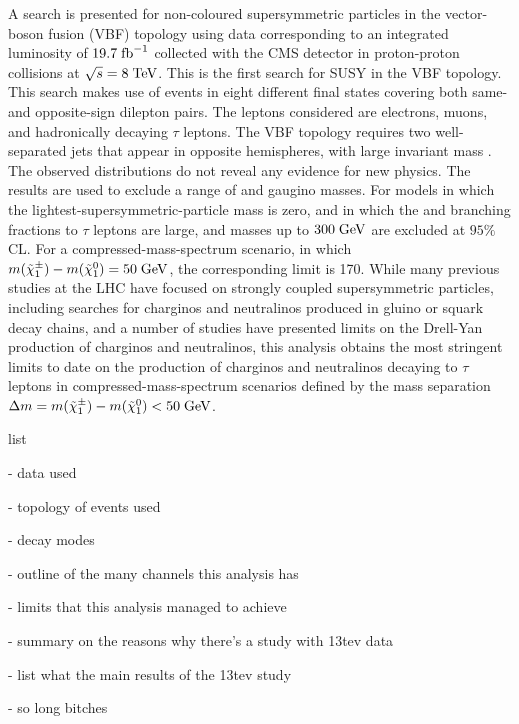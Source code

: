 


A search is presented for non-coloured supersymmetric particles in the vector-boson fusion (VBF) topology using data corresponding to an integrated luminosity of $19.7\;\text{fb}^{-1}$ collected with the CMS detector in proton-proton collisions at $\sqrt{s} = 8\;\text{Te}\kern-0.06667em\text{V}$. This is the first search for SUSY in the VBF topology. This search makes use of events in eight different final states covering both same- and opposite-sign dilepton pairs. The leptons considered are electrons, muons, and hadronically decaying $\tau$ leptons. The VBF topology requires two well-separated jets that appear in opposite hemispheres, with large invariant mass \mjj. The observed \mjj distributions do not reveal any evidence for new physics. The results are used to exclude a range of \charginopm and \neutralinotwo gaugino masses. For models in which the \neutralinoone lightest-supersymmetric-particle mass is zero, and in which the \charginopm and \neutralinotwo branching fractions to $\tau$ leptons are large, \charginopm and \neutralinotwo masses up to $300\;\text{Ge}\kern-0.06667em\text{V}$ are excluded at $95\%$ CL. For a compressed-mass-spectrum scenario, in which $m(\tilde{\chi}^{\pm}_{1}) - m(\tilde{\chi}^{0}_{1}) = 50\;\text{Ge}\kern-0.06667em\text{V}$, the corresponding limit is 170\gev. While many previous studies at the LHC have focused on strongly coupled supersymmetric particles, including searches for charginos and neutralinos produced in gluino or squark decay chains, and a number of studies have presented limits on the Drell-Yan production of charginos and neutralinos, this analysis obtains the most stringent limits to date on the production of charginos and neutralinos decaying to $\tau$ leptons in compressed-mass-spectrum scenarios defined by the mass separation $\Delta m = m(\tilde{\chi}^{\pm}_{1}) - m(\tilde{\chi}^{0}_{1}) < 50\;\text{Ge}\kern-0.06667em\text{V}$.

list 

- data used 

- topology of events used

- decay modes

- outline of the many channels this analysis has 

- limits that this analysis managed to achieve

- summary on the reasons why there's a study with 13tev data

- list what the main results of the 13tev study 

- so long bitches